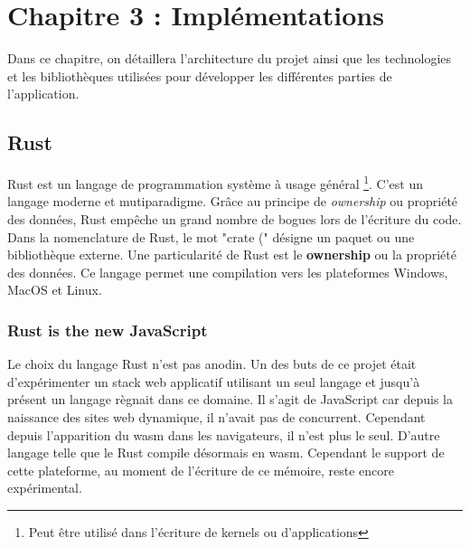 \chapter{Chapitre 3 : Implémentations}

Dans ce chapitre, on détaillera l'architecture du projet 
ainsi que les technologies et les bibliothèques utilisées
pour développer les différentes parties de l'application.


\section{Rust}

Rust est un langage de programmation système à usage général \footnote{Peut être
utilisé dans l'écriture de kernels ou d'applications}. C'est un langage moderne
et mutiparadigme.
Grâce au principe de \textit{ownership} ou propriété des données, Rust empêche un grand nombre de
bogues lors de l'écriture du code. 
Dans la nomenclature de Rust, le mot "crate (" désigne un paquet ou une bibliothèque
externe.
Une particularité de Rust est le \textbf{ownership} ou la propriété des données.
Ce langage permet une compilation vers les plateformes Windows, MacOS et Linux.

\subsection{Rust is the new JavaScript} 

Le choix du langage Rust n'est pas anodin.
Un des buts de ce projet était d'expérimenter un stack
web applicatif utilisant un seul langage et jusqu'à présent un langage règnait dans ce domaine.
Il s'agit de JavaScript car depuis la naissance des sites web dynamique, il
n'avait pas de concurrent.
Cependant depuis l'apparition du \gls{wasm} dans les navigateurs, il n'est plus
le seul. D'autre langage telle que le Rust compile désormais en \gls{wasm}.
Cependant le support de cette plateforme, au moment de l'écriture de ce mémoire,
reste encore expérimental.


